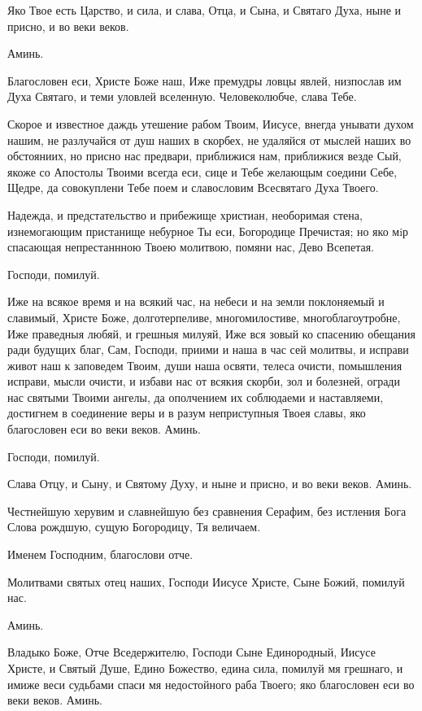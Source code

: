 \begin{mymulticols}
 Яко Твое есть Царство, и сила, и слава, Отца, и Сына, и Святаго Духа, ныне и присно, и во веки веков.

 Аминь.




\myemph{ [Если пост, или нет кондака, читаем эти тропари, глас 8-й:}

Благословен еси, Христе Боже наш, Иже премудры ловцы явлей, низпослав им Духа Святаго, и теми уловлей вселенную. Человеколюбче, слава Тебе.

\slavan

Скорое и известное даждь утешение рабом Твоим, Иисусе, внегда унывати духом нашим, не разлучайся от душ наших в скорбех, не удаляйся от мыслей наших во обстояниих, но присно нас предвари, приближися нам, приближися везде Сый, якоже со Апостолы Твоими всегда еси, сице и Тебе желающым соедини Себе, Щедре, да совокуплени Тебе поем и славословим Всесвятаго Духа Твоего.

\inynen

 Надежда, и предстательство и прибежище христиан, необоримая стена, изнемогающим пристанище небурное Ты еси, Богородице Пречистая; но яко мiр спасающая непрестаннною Твоею молитвою, помяни нас, Дево Всепетая.\myemph{]}

Господи, помилуй.

Иже на всякое время и на всякий час, на небеси и на земли поклоняемый и славимый, Христе Боже, долготерпеливе, многомилостиве, многоблагоутробне, Иже праведныя любяй, и грешныя милуяй, Иже вся зовый ко спасению обещания ради будущих благ, Сам, Господи, приими и наша в час сей молитвы, и исправи живот наш к заповедем Твоим, души наша освяти, телеса очисти, помышления исправи, мысли очисти, и избави нас от всякия скорби, зол и болезней, огради нас святыми Твоими ангелы, да ополчением их соблюдаеми и наставляеми, достигнем в соединение веры и в разум неприступныя Твоея славы, яко благословен еси во веки веков. Аминь.

Господи, помилуй.

Слава Отцу, и Сыну, и Святому Духу, и ныне и присно, и во веки веков. Аминь.

Честнейшую херувим и славнейшую без сравнения Серафим, без истления Бога Слова рождшую, сущую Богородицу, Тя величаем.

Именем Господним, благослови отче.

 Молитвами святых отец наших, Господи Иисусе Христе, Сыне Божий, помилуй нас.

 Аминь.



Владыко Боже, Отче Вседержителю, Господи Сыне Единородный, Иисусе Христе, и Святый Душе, Едино Божество, едина сила, помилуй мя грешнаго, и имиже веси судьбами спаси мя недостойного раба Твоего; яко благословен еси во веки веков. Аминь.


\end{mymulticols}

